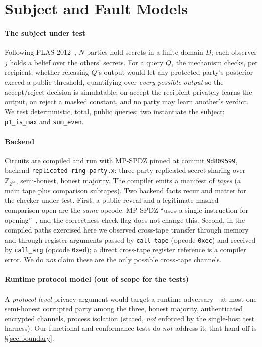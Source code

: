 \documentclass[conference]{IEEEtran}
\newcommand{\code}[1]{\texttt{\small #1}}
\newcommand{\Ztfour}{\mathbb{Z}_{2^{64}}}
\newcommand{\calltape}{\code{call\_tape}}
\newcommand{\callarg}{\code{call\_arg}}
\begin{document}
\section{Subject and Fault Models}
\label{sec:background}

\paragraph{The subject under test}
Following PLAS 2012~\cite{plas2012}, $N$ parties hold secrets in a finite domain $D$;
each observer $j$ holds a belief over the others' secrets. For a query $Q$, the mechanism
checks, per recipient, whether releasing $Q$'s output would let any protected party's
posterior exceed a public threshold, quantifying over \emph{every possible output} so the
accept/reject decision is simulatable; on accept the recipient privately learns the
output, on reject a masked constant, and no party may learn another's verdict. We test
deterministic, total, public queries; two instantiate the subject: \code{p1\_is\_max} and
\code{sum\_even}.

\paragraph{Backend}
Circuits are compiled and run with MP-SPDZ pinned at commit \code{9d809599}, backend
\code{replicated-ring-party.x}: three-party replicated secret sharing over $\Ztfour$,
semi-honest, honest majority. The compiler emits a manifest of \emph{tapes} (a main tape
plus comparison subtapes). Two backend facts recur and matter for the checker under test.
First, a public reveal and a legitimate masked comparison-open are the \emph{same} opcode:
MP-SPDZ ``uses a single instruction for opening''~\cite{keller2020mpspdz}, and the
correctness-check flag does not change this. Second, in the compiled paths exercised here
we observed cross-tape transfer through memory and through register arguments passed by
\calltape{} (opcode \code{0xec}) and received by \callarg{} (opcode \code{0xed}); a direct
cross-tape register reference is a compiler error. We do \emph{not} claim these are the
only possible cross-tape channels.

\paragraph{Runtime protocol model (out of scope for the tests)}
A \emph{protocol-level} privacy argument would target a runtime adversary---at most one
semi-honest corrupted party among the three, honest majority, authenticated encrypted
channels, process isolation (stated, \emph{not} enforced by the single-host test
harness). Our functional and conformance tests do \emph{not} address it; that hand-off is
\S\ref{sec:boundary}.
\end{document}
